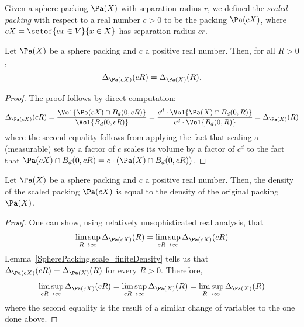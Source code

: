 \begin{definition}\label{SpherePacking.scale}\leanok
  Given a sphere packing $\Pa(X)$ with separation radius $r$, we defined the \emph{scaled packing} with respect to a real number $c > 0$ to be the packing $\Pa(cX)$, where $cX = \setof{cx \in V}{x \in X}$ has separation radius $cr$.
\end{definition}

\begin{lemma}\label{SpherePacking.scale_finiteDensity}\leanok
  Let $\Pa(X)$ be a sphere packing and $c$ a positive real number. Then, for all $R > 0$,
  \[
    \Delta_{\Pa(cX)}(cR) = \Delta_{\Pa(X)}(R).
  \]
\end{lemma}
\begin{proof}\leanok
  The proof follows by direct computation:
  \[
    \Delta_{\Pa(cX)}(cR) = \frac{\Vol{\Pa(cX) \cap B_d(0, cR)}}{\Vol{B_d(0, cR)}} = \frac{c^d \cdot \Vol{\Pa(X) \cap B_d(0, R)}}{c^d \cdot \Vol{B_d(0, R)}}
    = \Delta_{\Pa(X)}(R)
  \]
  where the second equality follows from applying the fact that scaling a (measurable) set by a factor of $c$ scales its volume by a factor of $c^d$ to the fact that $\Pa(cX) \cap B_d(0, cR) = c \cdot (\Pa(X) \cap B_d(0, cR))$.
\end{proof}

\begin{lemma}\label{SpherePacking.scale_density}\leanok
  Let $\Pa(X)$ be a sphere packing and $c$ a positive real number. Then, the density of the scaled packing $\Pa(cX)$ is equal to the density of the original packing $\Pa(X)$.
\end{lemma}
\begin{proof}\leanok
  One can show, using relatively unsophisticated real analysis, that
  \[
    \limsup_{R \to \infty} \Delta_{\Pa(cX)}(R) = \limsup_{cR \to \infty} \Delta_{\Pa(cX)}(cR)
  \]
  Lemma~\ref{SpherePacking.scale_finiteDensity} tells us that $\Delta_{\Pa(cX)}(cR) = \Delta_{\Pa(X)}(R)$ for every $R > 0$. Therefore,
  \[
    \limsup_{cR \to \infty} \Delta_{\Pa(cX)}(cR) = \limsup_{cR \to \infty} \Delta_{\Pa(X)}(R) = \limsup_{R \to \infty} \Delta_{\Pa(X)}(R)
  \]
  where the second equality is the result of a similar change of variables to the one done above.
\end{proof}

